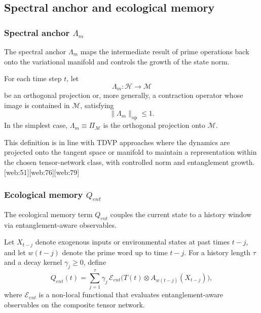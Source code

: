 \documentclass[11pt]{article}
\begin{document}
\subsection{Spectral anchor and ecological memory}

\subsubsection{Spectral anchor \( \Lambda_m \)}

The spectral anchor \( \Lambda_m \) maps the intermediate result of prime operations back onto the variational manifold and controls the growth of the state norm.

\begin{description}[leftmargin=2em]
\item[Definition 2 (Spectral anchor).] 
For each time step \( t \), let
\[
\Lambda_m : \mathcal{H} \to \mathcal{M}
\]
be an orthogonal projection or, more generally, a contraction operator whose image is contained in \( \mathcal{M} \), satisfying
\[
\|\Lambda_m\|_{\mathrm{op}} \le 1.
\]
In the simplest case, \( \Lambda_m \equiv \Pi_{\mathcal{M}} \) is the orthogonal projection onto \( \mathcal{M} \).

\end{description}

This definition is in line with TDVP approaches where the dynamics are projected onto the tangent space or manifold to maintain a representation within the chosen tensor-network class, with controlled norm and entanglement growth.[web:51][web:76][web:79]

\subsubsection{Ecological memory \( Q_{ent} \)}

The ecological memory term \( Q_{ent} \) couples the current state to a history window via entanglement-aware observables.

\begin{description}[leftmargin=2em]
\item[Definition 3 (Ecological memory).]
Let \( X_{t-j} \) denote exogenous inputs or environmental states at past times \( t-j \), and let \( w(t-j) \) denote the prime word up to time \( t-j \). For a history length \( \tau \) and a decay kernel \( \gamma_j \ge 0 \), define
\[
Q_{ent}(t)
=
\sum_{j=1}^{\tau}
\gamma_j\,
\mathcal{E}_{ent}\big(T(t) \otimes A_{w(t-j)}(X_{t-j})\big),
\]
where \( \mathcal{E}_{ent} \) is a non-local functional that evaluates entanglement-aware observables on the composite tensor network.

\end{description}
\end{document}
